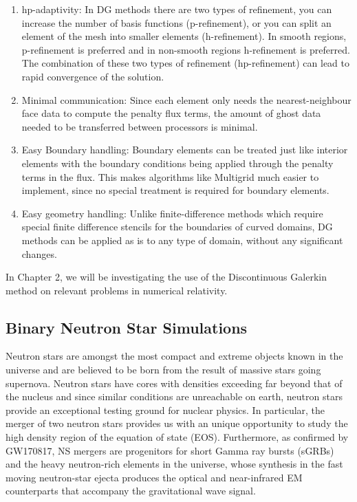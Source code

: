 \begin{enumerate}
\item hp-adaptivity: In DG methods there are two types of refinement, you can increase the number of basis functions (p-refinement), or you can split an element of the mesh into smaller elements (h-refinement). In smooth regions, p-refinement is preferred and in non-smooth regions h-refinement is preferred. The combination of these two types of refinement (hp-refinement) can lead to rapid convergence of the solution.
\item Minimal communication: Since each element only needs the nearest-neighbour face data to compute the penalty flux terms, the amount of ghost data needed to be transferred between processors is minimal.
\item Easy Boundary handling: Boundary elements can be treated just like interior elements with the boundary conditions being applied through the penalty terms in the flux. This makes algorithms like Multigrid much easier to implement, since no special treatment is required for boundary elements.
\item Easy geometry handling: Unlike finite-difference methods which require special finite difference stencils for the boundaries of curved domains, DG methods can be applied as is to any type of domain, without any significant changes.
\end{enumerate}

In Chapter 2, we will be investigating the use of the Discontinuous Galerkin method on relevant problems in numerical relativity.

\subsection{Binary Neutron Star Simulations}

Neutron stars are amongst the most compact and extreme objects known in
the universe and are believed to be born from the result of
massive stars going supernova. Neutron stars have cores with densities exceeding far beyond that
of the nucleus and since similar conditions are unreachable on earth, neutron stars provide an exceptional testing ground for nuclear physics. In particular, the merger of two neutron stars provides us with an unique opportunity to study the high density region of the equation of state (EOS). Furthermore, as confirmed by GW170817, NS mergers are progenitors for short Gamma ray bursts (sGRBs) and the
heavy neutron-rich elements in the universe, whose synthesis in the fast moving neutron-star ejecta produces the optical and near-infrared EM counterparts that accompany the gravitational wave signal.

